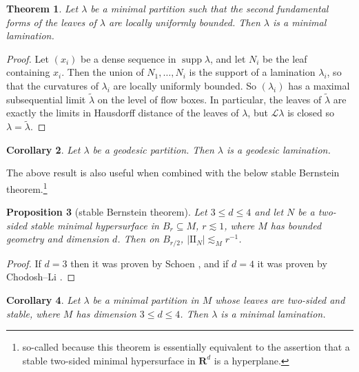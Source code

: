 \documentclass[reqno,11pt]{amsart}
\newcommand{\RR}{\mathbf{R}}
\DeclareMathOperator{\supp}{supp}
\newcommand{\Leaves}{\mathscr L}
\newcommand{\Two}{\mathrm{I\!I}}
\newtheorem{theorem}{Theorem}[section]
\newtheorem{proposition}[theorem]{Proposition}
\newtheorem{corollary}[theorem]{Corollary}
\theoremstyle{definition}
\numberwithin{equation}{section}
\begin{document}
\begin{theorem}
Let $\lambda$ be a minimal partition such that the second fundamental forms of the leaves of $\lambda$ are locally uniformly bounded.
Then $\lambda$ is a minimal lamination.
\end{theorem}
\begin{proof}
Let $(x_i)$ be a dense sequence in $\supp \lambda$, and let $N_i$ be the leaf containing $x_i$.
Then the union of $N_1, \dots, N_i$ is the support of a lamination $\lambda_i$, so that the curvatures of $\lambda_i$ are locally uniformly bounded.
So $(\lambda_i)$ has a maximal subsequential limit $\tilde \lambda$ on the level of flow boxes.
In particular, the leaves of $\tilde \lambda$ are exactly the limits in Hausdorff distance of the leaves of $\lambda$, but $\Leaves \lambda$ is closed so $\lambda = \tilde \lambda$.
\end{proof}

\begin{corollary}
Let $\lambda$ be a geodesic partition. Then $\lambda$ is a geodesic lamination.
\end{corollary}

The above result is also useful when combined with the below stable Bernstein theorem.\footnote{so-called because this theorem is essentially equivalent to the assertion that a stable two-sided minimal hypersurface in $\RR^d$ is a hyperplane.}

\begin{proposition}[stable Bernstein theorem]
Let $3 \leq d \leq 4$ and let $N$ be a two-sided stable minimal hypersurface in $B_r \subseteq M$, $r \lesssim 1$, where $M$ has bounded geometry and dimension $d$.
Then on $B_{r/2}$, $|\Two_N| \lesssim_M r^{-1}$.
\end{proposition}
\begin{proof}
If $d = 3$ then it was proven by Schoen \cite[Corollary 2.11]{colding2011course}, and if $d = 4$ it was proven by Chodosh--Li \cite{Chodosh2021}.
\end{proof}

\begin{corollary}
Let $\lambda$ be a minimal partition in $M$ whose leaves are two-sided and stable, where $M$ has dimension $3 \leq d \leq 4$.
Then $\lambda$ is a minimal lamination.
\end{corollary}

\printbibliography
\end{document}
